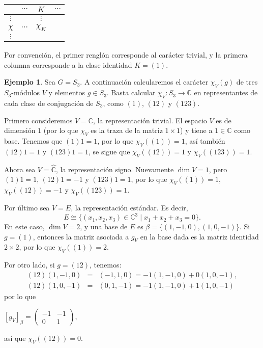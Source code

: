 \documentclass[12pt]{book}
\theoremstyle{definition}
\newtheorem{example}[theorem]{Ejemplo}
\newcounter{in}
\begin{document}
\begin{center}
  \begin{tabular}{c |c c c}
    & $\cdots$ & $K$ & $\cdots$\\
    \hline
    $\vdots$ &  & $\vdots$  \\
    $\chi$   & $\cdots$ & $\chi_{K}$  \\
    $\vdots$ &          &   
  \end{tabular}
\end{center}
Por convención, el primer renglón corresponde al carácter trivial, y la
primera columna corresponde a la clase identidad $K=(1)$.

\begin{example}
  \label{caracteres-S3}
  Sea $G=S_{3}$. A continuación calcularemos el
  carácter $\chi_{V}(g)$ de tres $S_{3}$-módulos $V$ y elementos
  $g\in S_{3}$. Basta calcular $\chi_{V}:S_{3}\rightarrow\mathbb{C}$
  en representantes de cada clase de conjugación de $S_{3}$, como $(1)$,
  $(12)$ y $(123)$.
  
  Primero consideremos $V=\mathbb{C}$, la representación trivial. El
  espacio $V$ es de dimensión $1$ (por lo que $\chi_{V}$ es la traza de
  la matriz $1\times 1$) y tiene a $1\in \mathbb{C}$ como
  base. Tenemos que $(1)1=1$, por lo que $\chi_{V}((1))=1$, así también
  $(12)1=1$ y $(123)1=1$, se sigue que $\chi_{V}((12))=1$ y
  $\chi_{V}((123))=1$.

  Ahora sea $V=\mathbb{\hat C}$, la representación signo. Nuevamente
  $\dim V=1$, pero $(1)1=1$, $(12)1=-1$ y $(123)1=1$, por lo que
  $\chi_{V}((1))=1$,  $\chi_{V}((12))=-1$ y  $\chi_{V}((123))=1$.

  Por último sea $V=E$, la representación estándar. Es decir,
  \begin{equation*}
    E\cong\{(x_{1},x_{2},x_{3})\in \mathbb{C}^{3}\mid x_{1}+x_{2}+x_{3}=0\}.
  \end{equation*}
  En este caso, $\dim V=2$, y una base de $E$ es
  $\beta=\{(1,-1,0),(1,0,-1)\}$. Si $g=(1)$, entonces la matriz
  asociada a $g_{V}$ en la base dada es la matriz identidad $2\times
  2$, por lo que $\chi_{V}((1))=2$.
  
  Por otro lado, si $g=(12)$, tenemos:
  \begin{eqnarray*}
    (12)(1,-1,0)&=&(-1,1,0)=-1(1,-1,0)+0(1,0,-1),\\
    (12)(1,0,-1)&=&(0,1,-1)=-1(1,-1,0)+1(1,0,-1)
  \end{eqnarray*} 
  por lo que 
  \begin{center}
  $[g_{V}]_{\beta}=
  \begin{pmatrix}
    -1 & -1 \\
    0 & 1 
  \end{pmatrix}$,
\end{center}
así que $\chi_{V}((12))=0$.


\end{example}
\end{document}
